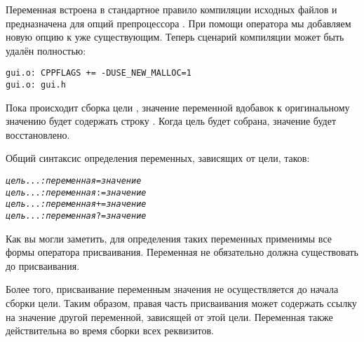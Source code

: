 Переменная  встроена в стандартное правило
компиляции исходных файлов \Clang{} и предназначена для опций
препроцессора \Clang{}. При помощи оператора \command{+=} мы добавляем
новую опцию к уже существующим. Теперь сценарий компиляции может
быть удалён полностью:

{\footnotesize
\begin{verbatim}
gui.o: CPPFLAGS += -DUSE_NEW_MALLOC=1
gui.o: gui.h
\end{verbatim}
}

Пока происходит сборка цели , значение переменной
 вдобавок к оригинальному значению будет содержать
строку . Когда цель 
будет собрана, значение  будет восстановлено.

Общий синтаксис определения переменных, зависящих от цели, таков:

{\footnotesize
\begin{alltt}
\emph{цель ...: переменная}  = \emph{значение}
\emph{цель ...: переменная} := \emph{значение}
\emph{цель ...: переменная} += \emph{значение}
\emph{цель ...: переменная} ?= \emph{значение}
\end{alltt}
}

Как вы могли заметить, для определения таких переменных применимы все
формы оператора присваивания. Переменная не обязательно должна
существовать до присваивания.

Более того, присваивание переменным значения не осуществляется до
начала сборки цели. Таким образом, правая часть присваивания может
содержать ссылку на значение другой переменной, зависящей от этой
цели. Переменная также действительна во время сборки всех реквизитов.
